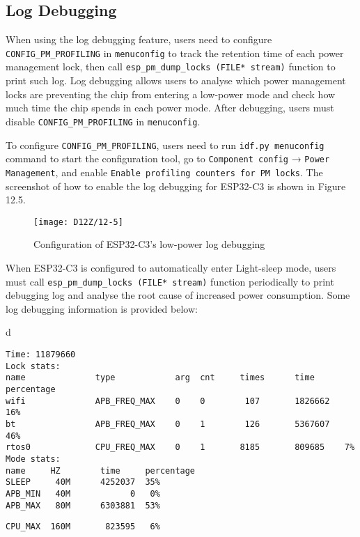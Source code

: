 \documentclass[a4paper,12pt]{book}
\begin{document}
\subsection{Log Debugging}
When using the log debugging feature, users need to configure \verb|CONFIG_PM_PROFILING| in \verb|menuconfig| to track the retention time of each power management lock, then call \verb|esp_pm_dump_locks (FILE* stream)| function to print such log. Log debugging allows users to analyse which power management locks are preventing the chip from entering a low-power mode and check how much time the chip spends in each power mode. After debugging, users must disable \verb|CONFIG_PM_PROFILING| in \verb|menuconfig|.

To configure \verb|CONFIG_PM_PROFILING|, users need to run \verb|idf.py menuconfig| command to start the configuration tool, go to \verb|Component config| → \verb|Power Management|, and enable \verb|Enable profiling counters for PM locks|. The screenshot of how to enable the log debugging for ESP32-C3 is shown in Figure 12.5.

\begin{figure}[!h]
    \centering
    \texttt{[image: D12Z/12-5]}
    \caption{Configuration of ESP32-C3’s low-power log debugging}
\end{figure}

When ESP32-C3 is configured to automatically enter Light-sleep mode, users must call \verb|esp_pm_dump_locks (FILE* stream)| function periodically to print debugging log and analyse the root cause of increased power consumption. Some log debugging information is provided below:

\begin{codebloc}
\begin{tabular}{d}
\vspace{2pt}
\begin{verbatim}
Time: 11879660
Lock stats:
name              type            arg  cnt     times      time      percentage
wifi              APB_FREQ_MAX    0    0        107       1826662   16%
bt                APB_FREQ_MAX    0    1        126       5367607   46%
rtos0             CPU_FREQ_MAX    0    1       8185       809685    7%
Mode stats:
name     HZ        time     percentage
SLEEP     40M      4252037  35%
APB_MIN   40M            0   0%
APB_MAX   80M      6303881  53%
\end{verbatim}
\verb|CPU_MAX  160M       823595   6%|
\end{tabular}
\end{codebloc}
\end{document}
